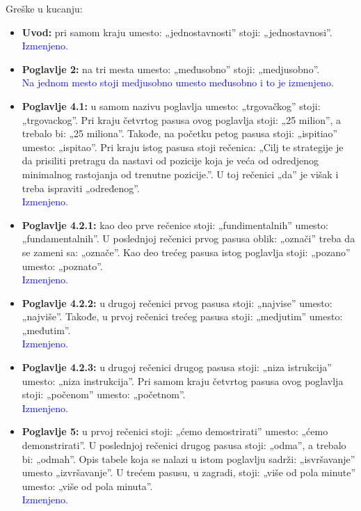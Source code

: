 \documentclass[a4paper]{report}
\newcommand{\odgovor}[1]{\textcolor{blue}{#1}}
\begin{document}
Greške u kucanju:
\begin{itemize}
 \item \textbf{Uvod:} pri samom kraju umesto: „jednostavnosti” stoji: „jednostavnosi”.
 \odgovor{Izmenjeno.\\}
 
 \item \textbf{Poglavlje 2:} na tri mesta umesto: „međusobno” stoji: „medjusobno”.\\
 \odgovor{Na jednom mesto stoji medjusobno umesto međusobno i to je izmenjeno.\\}
 
 \item \textbf{Poglavlje 4.1:} u samom nazivu poglavlja umesto: „trgovačkog” stoji: „trgovackog”. Pri kraju četvrtog pasusa ovog poglavlja stoji: „25 milion”, a trebalo bi: „25 miliona”. Takođe, na početku petog pasusa stoji: „ispitiao” umesto: „ispitao”. Pri kraju istog pasusa stoji rečenica: „Cilj te strategije je da prisiliti pretragu da nastavi od pozicije koja je veća od odredjenog minimalnog rastojanja od trenutne pozicije.”. U toj rečenici „da” je višak i treba ispraviti „određenog”.\\
 \odgovor{Izmenjeno.\\}
 \item \textbf{Poglavlje 4.2.1:} kao deo prve rečenice stoji: „fundimentalnih” umesto: „fundamentalnih”. U poslednjoj rečenici prvog pasusa oblik: „označi” treba da se zameni sa: „označe”. Kao deo trećeg pasusa istog poglavlja stoji: „pozano” umesto: „poznato”.\\
\odgovor{Izmenjeno.\\}
 
 \item \textbf{Poglavlje 4.2.2:} u drugoj rečenici prvog pasusa stoji: „najvise” umesto: „najviše”. Takođe, u prvoj rečenici trećeg pasusa stoji: „medjutim” umesto: „međutim”.\\
\odgovor{Izmenjeno.\\}
 
 \item \textbf{Poglavlje 4.2.3:} u drugoj rečenici drugog pasusa stoji: „niza istrukcija” umesto: „niza instrukcija”. Pri samom kraju četvrtog pasusa ovog poglavlja stoji: „počenom” umesto: „početnom”.\\
\odgovor{Izmenjeno.\\}
 
 \item \textbf{Poglavlje 5:} u prvoj rečenici stoji: „ćemo demostrirati” umesto: „ćemo demonstrirati”. U poslednjoj rečenici drugog pasusa stoji: „odma”, a trebalo bi: „odmah”. Opis tabele koja se nalazi u istom poglavlju sadrži: „isvršavanje” umesto „izvršavanje”. U trećem pasusu, u zagradi, stoji: „više od pola minute” umesto: „više od pola minuta”.\\
\odgovor{Izmenjeno.\\}
\end{itemize}
\end{document}
